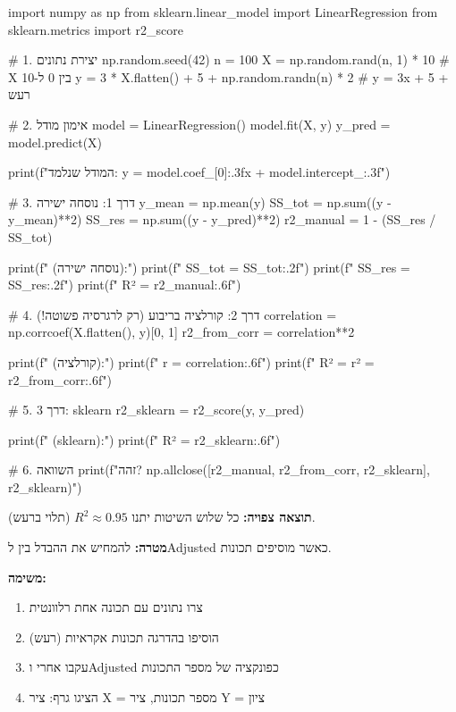 \begin{pythonbox}
import numpy as np
from sklearn.linear_model import LinearRegression
from sklearn.metrics import r2_score

# 1. יצירת נתונים
np.random.seed(42)
n = 100
X = np.random.rand(n, 1) * 10  # X בין 0 ל-10
y = 3 * X.flatten() + 5 + np.random.randn(n) * 2  # y = 3x + 5 + רעש

# 2. אימון מודל
model = LinearRegression()
model.fit(X, y)
y_pred = model.predict(X)

print(f"המודל שנלמד: y = {model.coef_[0]:.3f}x + {model.intercept_:.3f}")

# 3. דרך 1: נוסחה ישירה
y_mean = np.mean(y)
SS_tot = np.sum((y - y_mean)**2)
SS_res = np.sum((y - y_pred)**2)
r2_manual = 1 - (SS_res / SS_tot)

print(f" (נוסחה ישירה):")
print(f"  SS_tot = {SS_tot:.2f}")
print(f"  SS_res = {SS_res:.2f}")
print(f"  R² = {r2_manual:.6f}")

# 4. דרך 2: קורלציה בריבוע (רק לרגרסיה פשוטה!)
correlation = np.corrcoef(X.flatten(), y)[0, 1]
r2_from_corr = correlation**2

print(f" (קורלציה):")
print(f"  r = {correlation:.6f}")
print(f"  R² = r² = {r2_from_corr:.6f}")

# 5. דרך 3: sklearn
r2_sklearn = r2_score(y, y_pred)

print(f" (sklearn):")
print(f"  R² = {r2_sklearn:.6f}")

# 6. השוואה
print(f" זהה? {np.allclose([r2_manual, r2_from_corr, r2_sklearn], r2_sklearn)}")
\end{pythonbox}

\textbf{תוצאה צפויה:} כל שלוש השיטות יתנו $R^2 \approx \num{0.95}$ (תלוי ברעש).


\textbf{מטרה:} להמחיש את ההבדל בין \Rsquared{} ל\en{-}Adjusted \Rsquared{} כאשר מוסיפים תכונות.

\textbf{משימה:}

\begin{enumerate}
\item צרו נתונים עם תכונה אחת רלוונטית
\item הוסיפו בהדרגה תכונות אקראיות (רעש)
\item עקבו אחרי \Rsquared{} ו\en{-}Adjusted \Rsquared{} כפונקציה של מספר התכונות
\item הציגו גרף: ציר X = מספר תכונות, ציר Y = ציון
\end{enumerate}

